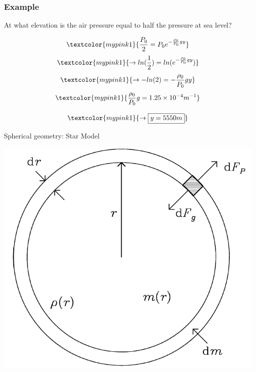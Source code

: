 \documentclass[]{beamer}
\begin{document}
\begin{frame}
\frametitle{Example \theexample}
At what
elevation is the air pressure equal to half the pressure at sea level?
\pause


\begin{equation*}
  \textcolor{mypink1}{\frac{P_0}{2}=P_0 e^{-\frac{\rho_0}{P_0}gy}}
\end{equation*}
\pause
\begin{equation*}
  \textcolor{mypink1}{\rightarrow ln(\frac{1}{2})=ln( e^{-\frac{\rho_0}{P_0}gy})}
\end{equation*}
\pause
\begin{equation*}
  \textcolor{mypink1}{\rightarrow- ln(2)=-\frac{\rho_0}{P_0}gy}
\end{equation*}
\pause
\begin{equation*}
  \textcolor{mypink1}{\frac{\rho_0}{P_0}g=1.25 \times 10^{-4}m^{-1}}
\end{equation*}
\pause

\begin{equation*}
  \textcolor{mypink1}{\rightarrow\boxed{ y=5550 m}}
\end{equation*}


  \end{frame}




\begin{frame}
  \textcolor{mypink1}{Spherical geometry: Star Model}
\vspace{3mm}



  
  \begin{center}
  \includegraphics[height=2.in]{images2/star3.jpg}
\end{center}





  \end{frame}
\end{document}
